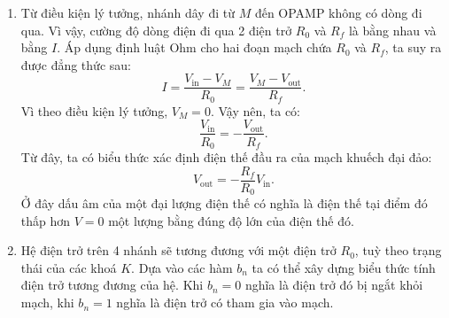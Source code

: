 \begin{center}
\begin{enumerate}[label=(\alph*)]
\item 
    \begin{figure}[ht]
    \centering
    \label{fig:63}
    \end{figure}    
Từ điều kiện lý tưởng, nhánh dây đi từ $M$ đến OPAMP không có dòng đi qua. Vì vậy, cường độ dòng điện đi qua 2 điện trở $R_0$ và $R_f$ là bằng nhau và bằng $I$.
Áp dụng định luật Ohm cho hai đoạn mạch chứa $R_0$ và $R_f$, ta suy ra được đẳng thức sau:
\begin{equation}
    I = \dfrac{V_\text{in}-V_M}{R_0} = \dfrac{V_M-V_\text{out}}{R_f}.
    \label{eq:59}
\end{equation}
Vì theo điều kiện lý tưởng, $V_M = 0$. Vậy nên, ta có:
    \begin{equation}
    \dfrac{V_\text{in}}{R_0} = - \dfrac{V_\text{out}}{R_f}.
     \label{eq:60}
    \end{equation}
Từ đây, ta có biểu thức xác định điện thế đầu ra của mạch khuếch đại đảo:
    \begin{equation}
     \boxed{V_\text{out} = - \dfrac{ R_f }{ R_0 }  { V_\text{in}. }}
     \label{eq:64}
    \end{equation}    
Ở đây dấu âm của một đại lượng điện thế có nghĩa là điện thế tại điểm đó thấp hơn $V=0$ một lượng bằng đúng độ lớn của điện thế đó.  
    \item 
Hệ điện trở trên 4 nhánh sẽ tương đương với một điện trở $R_0$, tuỳ theo trạng thái của các khoá $K$. Dựa vào các hàm $b_n$ ta có thể xây dựng biểu thức tính điện trở tương đương của hệ. Khi $b_n=0$ nghĩa là điện trở đó bị ngắt khỏi mạch, khi $b_n=1$ nghĩa là điện trở có tham gia vào mạch. 


\end{enumerate}
\end{center}
